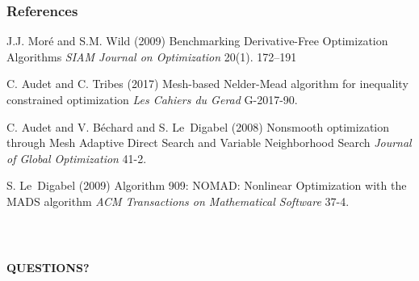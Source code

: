\documentclass[11pt,utf8,compress]{beamer}
\begin{document}
\begin{frame}
\frametitle{References}
\footnotesize{
	\begin{thebibliography}{99} %
		 J.J. Mor\'e and S.M. Wild (2009)
		\newblock   Benchmarking Derivative-Free Optimization Algorithms
		\newblock \emph{SIAM Journal on Optimization} 20(1). 172--191
		
		 C. Audet and C. Tribes (2017)
		\newblock Mesh-based Nelder-Mead algorithm for inequality constrained
		optimization
		\newblock \emph{Les Cahiers du Gerad} G-2017-90.
		
		C. Audet and V. B\'echard and S. {Le~Digabel} (2008)
		\newblock Nonsmooth optimization through Mesh Adaptive Direct Search
		and Variable Neighborhood Search
		\newblock \emph{Journal of Global Optimization} 41-2.
		
		 S. {Le~Digabel} (2009)
		\newblock Algorithm 909: NOMAD: Nonlinear Optimization with the MADS algorithm
		\newblock \emph{{ACM} Transactions on Mathematical Software} 37-4.
	\end{thebibliography}
}
\end{frame}
\begin{frame}
	\frametitle{~}
	\centering
	{\LARGE \textbf{QUESTIONS?}}
\end{frame}
\end{document}
